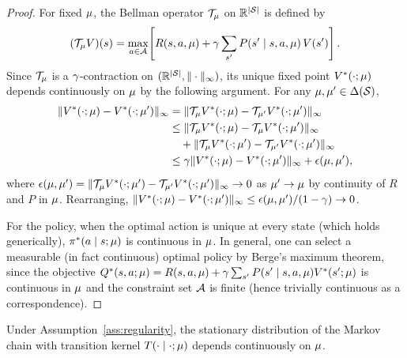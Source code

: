 \documentclass[11pt,a4paper]{article}
\begin{document}
\begin{proof}
For fixed $\mu$, the Bellman operator $\mathcal{T}_\mu$
on $\mathbb{R}^{|\mathcal{S}|}$ is defined by
\[
  (\mathcal{T}_\mu V)(s) = \max_{a \in \mathcal{A}}\!\left[
    R(s, a, \mu) + \gamma \sum_{s'}
    P(s' \mid s, a, \mu)\, V(s')
  \right].
\]
Since $\mathcal{T}_\mu$ is a $\gamma$-contraction on
$(\mathbb{R}^{|\mathcal{S}|}, \|\cdot\|_\infty)$, its unique fixed point
$V^*(\cdot; \mu)$ depends continuously on $\mu$ by
the following argument.  For any $\mu, \mu' \in
\Delta(\mathcal{S})$,
\begin{align*}
  \|V^*(\cdot; \mu) - V^*(\cdot; \mu')\|_\infty
  &= \|\mathcal{T}_\mu V^*(\cdot; \mu)
    - \mathcal{T}_{\mu'} V^*(\cdot; \mu')\|_\infty \\
  &\leq \|\mathcal{T}_\mu V^*(\cdot; \mu)
    - \mathcal{T}_\mu V^*(\cdot; \mu')\|_\infty \\
  &\quad + \|\mathcal{T}_\mu V^*(\cdot; \mu')
    - \mathcal{T}_{\mu'} V^*(\cdot; \mu')\|_\infty \\
  &\leq \gamma \|V^*(\cdot; \mu)
    - V^*(\cdot; \mu')\|_\infty
    + \epsilon(\mu, \mu'),
\end{align*}
where $\epsilon(\mu, \mu') = \|\mathcal{T}_\mu
V^*(\cdot; \mu') - \mathcal{T}_{\mu'} V^*(\cdot;
\mu')\|_\infty \to 0$ as $\mu' \to \mu$ by
continuity of $R$ and $P$ in $\mu$.  Rearranging,
$\|V^*(\cdot; \mu) - V^*(\cdot; \mu')\|_\infty
\leq \epsilon(\mu, \mu') / (1 - \gamma) \to 0$.

For the policy, when the optimal action is unique at every state
(which holds generically), $\pi^*(a \mid s; \mu)$ is
continuous in $\mu$.  In general, one can select a
measurable (in fact continuous) optimal policy by Berge's maximum
theorem, since the objective $Q^*(s, a; \mu) = R(s, a,
\mu) + \gamma \sum_{s'} P(s' \mid s, a, \mu)
V^*(s'; \mu)$ is continuous in $\mu$ and the
constraint set $\mathcal{A}$ is finite (hence trivially continuous
as a correspondence).
\end{proof}

\begin{lemma}
\label{lem:forward-continuity}
Under Assumption~\ref{ass:regularity}, the stationary distribution
of the Markov chain with transition kernel $T(\cdot \mid \cdot;
\mu)$ depends continuously on $\mu$.
\end{lemma}
\end{document}
